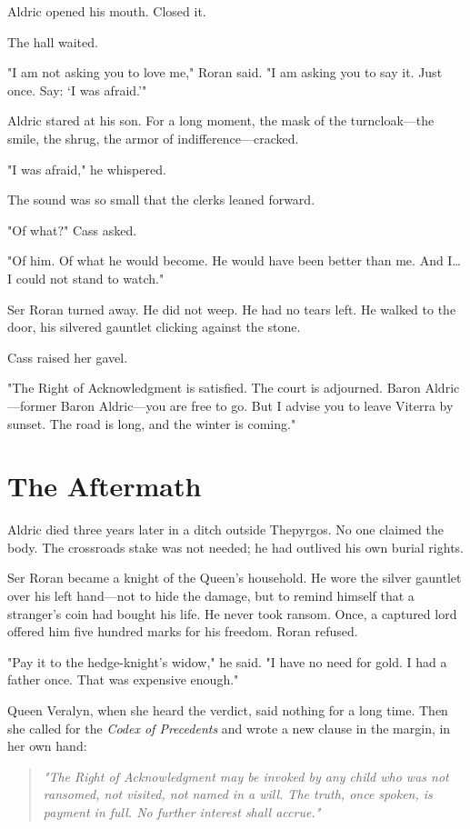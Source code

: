 \documentclass[11pt,twoside]{book}
\begin{document}
Aldric opened his mouth. Closed it.

The hall waited.

"I am not asking you to love me," Roran said. "I am asking you to say it. Just once. Say: `I was afraid.'"

Aldric stared at his son. For a long moment, the mask of the turncloak---the smile, the shrug, the armor of indifference---cracked.

"I was afraid," he whispered.

The sound was so small that the clerks leaned forward.

"Of what?" Cass asked.

"Of him. Of what he would become. He would have been better than me. And I\ldots{} I could not stand to watch."

Ser Roran turned away. He did not weep. He had no tears left. He walked to the door, his silvered gauntlet clicking against the stone.

Cass raised her gavel.

"The Right of Acknowledgment is satisfied. The court is adjourned. Baron Aldric---former Baron Aldric---you are free to go. But I advise you to leave Viterra by sunset. The road is long, and the winter is coming."

\section{The Aftermath}

Aldric died three years later in a ditch outside Thepyrgos. No one claimed the body. The crossroads stake was not needed; he had outlived his own burial rights.

Ser Roran became a knight of the Queen's household. He wore the silver gauntlet over his left hand---not to hide the damage, but to remind himself that a stranger's coin had bought his life. He never took ransom. Once, a captured lord offered him five hundred marks for his freedom. Roran refused.

"Pay it to the hedge-knight's widow," he said. "I have no need for gold. I had a father once. That was expensive enough."

Queen Veralyn, when she heard the verdict, said nothing for a long time. Then she called for the \textit{Codex of Precedents} and wrote a new clause in the margin, in her own hand:

\begin{quote}
\textit{"The Right of Acknowledgment may be invoked by any child who was not ransomed, not visited, not named in a will. The truth, once spoken, is payment in full. No further interest shall accrue."}
\end{quote}
\end{document}
